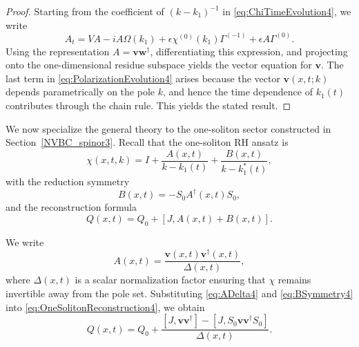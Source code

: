 \documentclass[11pt]{amsart}
\theoremstyle{definition}
\numberwithin{equation}{section}
\begin{document}
\begin{proof}
Starting from the coefficient of $(k-k_1)^{-1}$ in \eqref{eq:ChiTimeEvolution4}, we write
\[
A_t = VA - iA\Omega(k_1) + \epsilon \chi^{(0)}(k_1)\Gamma^{(-1)} + \epsilon A\Gamma^{(0)}.
\]
Using the representation $A=\mathbf{v}\mathbf{w}^\dagger$, differentiating this expression, and projecting onto the one-dimensional residue subspace yields the vector equation for $\mathbf{v}$. The last term in \eqref{eq:PolarizationEvolution4} arises because the vector $\mathbf{v}(x,t;k)$ depends parametrically on the pole $k$, and hence the time dependence of $k_1(t)$ contributes through the chain rule. This yields the stated result.
\end{proof}

We now specialize the general theory to the one-soliton sector constructed in Section~\ref{NVBC_spinor3}. Recall that the one-soliton RH ansatz is
\begin{equation}
\chi(x,t,k)=I+\frac{A(x,t)}{k-k_1(t)}+\frac{B(x,t)}{k-k_1^*(t)},
\label{eq:OneSolitonRH4}
\end{equation}
with the reduction symmetry
\begin{equation}
B(x,t)=-S_0A^\dagger(x,t)S_0,
\label{eq:BSymmetry4}
\end{equation}
and the reconstruction formula
\begin{equation}
Q(x,t)=Q_0+[J,A(x,t)+B(x,t)].
\label{eq:OneSolitonReconstruction4}
\end{equation}

We write
\begin{equation}
A(x,t)=\frac{\mathbf{v}(x,t)\mathbf{v}^\dagger(x,t)}{\Delta(x,t)},
\label{eq:ADelta4}
\end{equation}
where $\Delta(x,t)$ is a scalar normalization factor ensuring that $\chi$ remains invertible away from the pole set. Substituting \eqref{eq:ADelta4} and \eqref{eq:BSymmetry4} into \eqref{eq:OneSolitonReconstruction4}, we obtain
\begin{equation}
Q(x,t)=Q_0+\frac{[J,\mathbf{v}\mathbf{v}^\dagger]-[J,S_0\mathbf{v}\mathbf{v}^\dagger S_0]}{\Delta(x,t)}.
\label{eq:OneSolitonQIntermediate4}
\end{equation}
\end{document}
